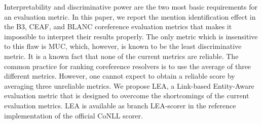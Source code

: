 Interpretability and discriminative power are the two most basic requirements for an evaluation metric. In this paper, we report the mention identification effect in the B3, CEAF, and BLANC coreference evaluation metrics that makes it impossible to interpret their results properly. The only metric which is insensitive to this flaw is MUC, which, however, is known to be the least discriminative metric. It is a known fact that none of the current metrics are reliable. The common practice for ranking coreference resolvers is to use the average of three different metrics. However, one cannot expect to obtain a reliable score by averaging three unreliable metrics. We propose LEA, a Link-based Entity-Aware evaluation metric that is designed to overcome the shortcomings of the current evaluation metrics. LEA is available as branch LEA-scorer in the reference implementation of the official CoNLL scorer.
